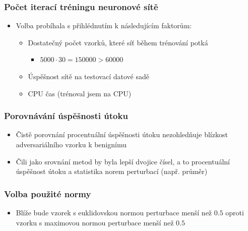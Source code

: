 \documentclass[czech]{beamer}
\begin{document}
\begin{frame}
    \frametitle{Počet iterací tréningu neuronové sítě}
    \begin{itemize}
        \item Volba probíhala s přihlédnutím k následujícím faktorům:
        \begin{itemize}
            \item Dostatečný počet vzorků, které síť během trénování potká
            \begin{itemize}
                \item $5000 \cdot 30 = 150000 > 60000$
            \end{itemize}
            \item Úspěšnost sítě na testovací datové sadě
            \item CPU čas (trénoval jsem na CPU)
        \end{itemize}
    \end{itemize}
\end{frame}

\begin{frame}
    \frametitle{Porovnávání úspěšnosti útoku}
    \begin{itemize}
        \item Čistě porovnání procentuální úspěšnosti útoku nezohledňuje blízkost adversariálního vzorku k benignímu
        \item Čili jako srovnání metod by byla lepší dvojice čísel, a to procentuální úspěšnost útoku a statistika norem perturbací (např. průměr)
    \end{itemize}
\end{frame}

\begin{frame}
    \frametitle{Volba použité normy}
    \begin{itemize}
        \item Blíže bude vzorek s euklidovskou normou perturbace menší než $0.5$ oproti vzorku s maximovou normou perturbace menší než $0.5$
    \end{itemize}
\end{frame}
\end{document}
